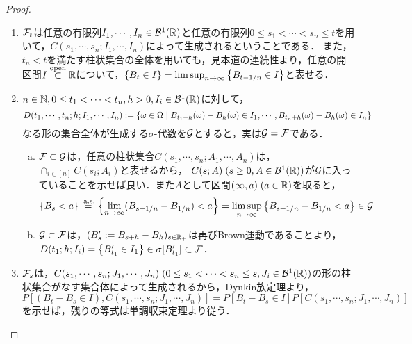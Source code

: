 \documentclass[uplatex,dvipdfmx]{jsreport}
\begin{document}
\begin{proof}\mbox{}
    \begin{enumerate}
        \item $\mathcal{F}_t$は任意の有限列$I_1,\cdots,I_n\in\mathcal{B}^1(\mathbb{R})$と任意の有限列$0\le s_1<\cdots<s_n\le t$を用いて，$C(s_1,\cdots,s_n;I_1,\cdots,I_n)$によって生成されるということである．
        また，$t_n<t$を満たす柱状集合の全体を用いても，見本道の連続性より，任意の開区間$I\overset{\mathrm{open}}{\subset}\mathbb{R}$について，$\left\{B_t\in I\right\}=\limsup_{n\to\infty}\left\{B_{t-1/n}\in I\right\}$と表せる．
        \item $n\in\mathbb{N},0\le t_1<\cdots<t_n,h>0,I_i\in\mathcal{B}^1(\mathbb{R})$に対して，
        \[D(t_1,\cdots,t_n;h;I_1,\cdots,I_n):=\left\{\omega\in\Omega\mid B_{t_1+h}(\omega)-B_{h}(\omega)\in I_1,\cdots,B_{t_n+h}(\omega)-B_h(\omega)\in I_n\right\}\]
        なる形の集合全体が生成する$\sigma$-代数を$\mathcal{G}$とすると，実は$\mathcal{G}=\mathcal{F}$である．
        \begin{enumerate}[(a)]
            \item $\mathcal{F}\subset\mathcal{G}$は，任意の柱状集合$C(s_1,\cdots,s_n;A_1,\cdots,A_n)$は，$\cap_{i\in[n]}C(s_i;A_i)$と表せるから，
            $C(s;A)\;(s\ge0,A\in\mathcal{B}^1(\mathbb{R}))$が$\mathcal{G}$に入っていることを示せば良い．また$A$として区間$(\infty,a)\;(a\in\mathbb{R})$を取ると，
            \[\left\{B_s<a\right\}\overset{\;\mathrm{a.s.}}{=}\left\{\lim_{n\to\infty}(B_{s+1/n}-B_{1/n})<a\right\}=\limsup_{n\to\infty}\left\{B_{s+1/n}-B_{1/n}<a\right\}\in\mathcal{G}\]
            \item $\mathcal{G}\subset\mathcal{F}$は，$(B'_s:=B_{s+h}-B_h)_{s\in\mathbb{R}_+}$は再びBrown運動であることより，$D(t_1;h;I_i)=\left\{B'_{t_1}\in I_1\right\}\in\sigma[B'_{t_1}]\subset\mathcal{F}$．
        \end{enumerate}
        \item $\mathcal{F}_s$は，$C(s_1,\cdots,s_n;J_1,\cdots,J_n)\;(0\le s_1<\cdots<s_n\le s,J_i\in\mathcal{B}^1(\mathbb{R}))$の形の柱状集合がなす集合体によって生成されるから，Dynkin族定理より，
        \[P[(B_t-B_s\in I),C(s_1,\cdots,s_n;J_1,\cdots,J_n)]=P[B_t-B_s\in I]P[C(s_1,\cdots,s_n;J_1,\cdots,J_n)]\]
        を示せば，残りの等式は単調収束定理より従う．


\end{enumerate}
\end{proof}
\end{document}
